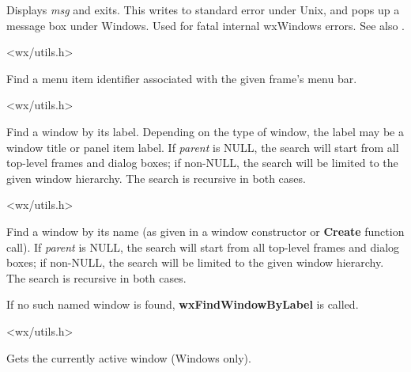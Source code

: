 Displays {\it msg} and exits. This writes to standard error under Unix,
and pops up a message box under Windows. Used for fatal internal
wxWindows errors. See also .


<wx/utils.h>



Find a menu item identifier associated with the given frame's menu bar.


<wx/utils.h>



Find a window by its label. Depending on the type of window, the label may be a window title
or panel item label. If {\it parent} is NULL, the search will start from all top-level
frames and dialog boxes; if non-NULL, the search will be limited to the given window hierarchy.
The search is recursive in both cases.


<wx/utils.h>

\label{wxfindwindowbyname}


Find a window by its name (as given in a window constructor or {\bf Create} function call).
If {\it parent} is NULL, the search will start from all top-level
frames and dialog boxes; if non-NULL, the search will be limited to the given window hierarchy.
The search is recursive in both cases.

If no such named window is found, {\bf wxFindWindowByLabel} is called.


<wx/utils.h>

\label{wxgetactivewindow}


Gets the currently active window (Windows only).

